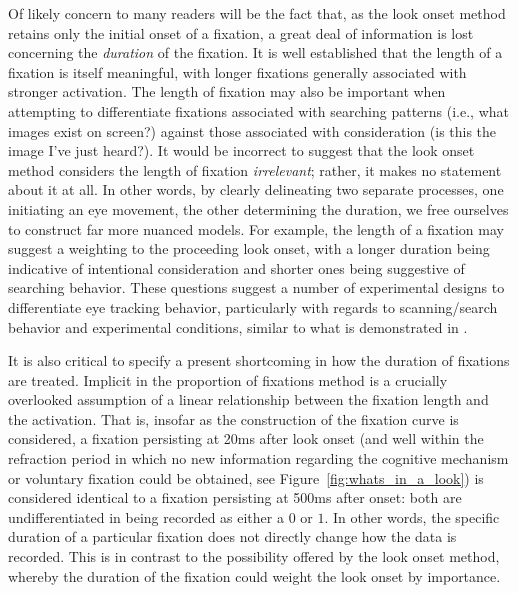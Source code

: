 Of likely concern to many readers will be the fact that, as the look onset method retains only the initial onset of a fixation, a great deal of information is lost concerning the \textit{duration} of the fixation. It is well established \citep{Salthouse1980} that the length of a fixation is itself meaningful, with longer fixations generally associated with stronger activation. The length of fixation may also be important when attempting to differentiate fixations associated with searching patterns (i.e., what images exist on screen?) against those associated with consideration (is this the image I've just heard?). It would be incorrect to suggest that the look onset method considers the length of fixation \textit{irrelevant}; rather, it makes no statement about it at all. In other words, by clearly delineating two separate processes, one initiating an eye movement, the other determining the duration, we free ourselves to construct far more nuanced models. For example, the length of a fixation may suggest a weighting to the proceeding look onset, with a longer duration being indicative of intentional consideration and shorter ones being suggestive of searching behavior. These questions suggest a number of experimental designs to differentiate eye tracking behavior, particularly with regards to scanning/search behavior and experimental conditions, similar to what is demonstrated in \citet{Apfelbaum2021}.


It is also critical to specify a present shortcoming in how the duration of fixations are treated. Implicit in the proportion of fixations method is a crucially overlooked assumption of a linear relationship between the fixation length and the activation. That is, insofar as the construction of the fixation curve is considered, a fixation persisting at 20ms after look onset (and well within the refraction period in which no new information regarding the cognitive mechanism or voluntary fixation could be obtained, see Figure~\ref{fig:whats_in_a_look}) is considered identical to a fixation persisting at 500ms after onset: both are undifferentiated in being recorded as either a $0$ or $1$. In other words, the specific duration of a particular fixation does not directly change how the data is recorded. This is in contrast to the possibility offered by the look onset method, whereby the duration of the fixation could weight the look onset by importance.

